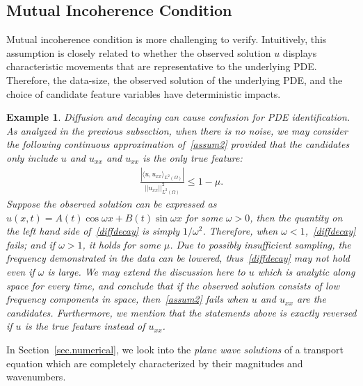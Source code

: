 \documentclass[a4paper,11pt]{article}
\newtheorem{example}{Example}[section]
\begin{document}
\subsection{Mutual Incoherence Condition}\label{sec.MIP}
Mutual incoherence condition is more challenging to verify. Intuitively, this assumption is closely related to whether the observed solution $u$ displays characteristic  movements that are representative to the underlying PDE. Therefore, the data-size, the observed solution of the underlying PDE, and the choice of candidate feature variables have deterministic impacts.
\begin{example} Diffusion and decaying can cause confusion for PDE identification. As analyzed in the previous subsection, when there is no noise, we may consider the following continuous approximation of~\eqref{assum2} provided that the candidates only include $u$ and $u_{xx}$ and $u_{xx}$ is the only true feature:
\begin{align}
\frac{|\langle u,u_{xx}\rangle_{L^2(\Omega)}|}{||u_{xx}||_{L^2(\Omega)}^2}\leq 1-\mu.\label{diffdecay}
\end{align}
Suppose the observed solution can be expressed as $u(x,t)=A(t)\cos \omega x+B(t)\sin \omega x$ for some $\omega>0$, then the quantity on the left hand side of~\eqref{diffdecay} is simply $1/\omega^2$. Therefore, when $\omega< 1$,~\eqref{diffdecay} fails; and if $\omega> 1$, it holds for some $\mu$. Due to possibly insufficient sampling, the frequency demonstrated in the data can be lowered, thus~\eqref{diffdecay} may not hold even if $\omega$ is large. We may extend the discussion here to $u$ which is analytic along space for every time, and conclude that if the observed solution consists of low frequency components in space, then~\eqref{assum2} fails when $u$ and $u_{xx}$ are the candidates. Furthermore, we mention that the statements above is exactly reversed if $u$ is the true feature instead of $u_{xx}$.
\end{example}
In Section~\ref{sec.numerical}, we look into the \textit{plane wave solutions} of a transport equation which are completely characterized by their magnitudes and wavenumbers.
\end{document}
